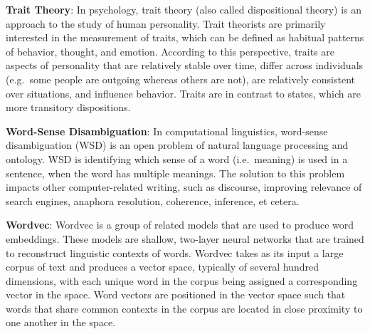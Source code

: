 \documentclass[b5paper,]{book}
\theoremstyle{definition}
\theoremstyle{definition}
\theoremstyle{definition}
\theoremstyle{remark}
\begin{document}
\textbf{Trait Theory}: In psychology, trait theory (also called
dispositional theory) is an approach to the study of human personality.
Trait theorists are primarily interested in the measurement of traits,
which can be defined as habitual patterns of behavior, thought, and
emotion. According to this perspective, traits are aspects of
personality that are relatively stable over time, differ across
individuals (e.g.~some people are outgoing whereas others are not), are
relatively consistent over situations, and influence behavior. Traits
are in contrast to states, which are more transitory dispositions.

\textbf{Word-Sense Disambiguation}: In computational linguistics,
word-sense disambiguation (WSD) is an open problem of natural language
processing and ontology. WSD is identifying which sense of a word
(i.e.~meaning) is used in a sentence, when the word has multiple
meanings. The solution to this problem impacts other computer-related
writing, such as discourse, improving relevance of search engines,
anaphora resolution, coherence, inference, et cetera.

\textbf{Wordvec}: Wordvec is a group of related models that are used to
produce word embeddings. These models are shallow, two-layer neural
networks that are trained to reconstruct linguistic contexts of words.
Wordvec takes as its input a large corpus of text and produces a vector
space, typically of several hundred dimensions, with each unique word in
the corpus being assigned a corresponding vector in the space. Word
vectors are positioned in the vector space such that words that share
common contexts in the corpus are located in close proximity to one
another in the space.


\end{document}
